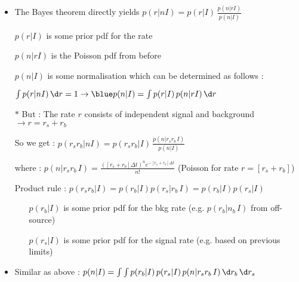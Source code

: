 \Tr
\begin{itemize}
\item The Bayes theorem directly yields {\blue $\displaystyle p(r|nI)=p(r|I)\,\frac{p(n|rI)}{p(n|I)}$}
\item[] $p(r|I)$ is some prior pdf for the rate
\item[] $p(n|rI)$ is the Poisson pdf from before
\item[] $p(n|I)$ is some normalisation which can be determined as follows :
\item[] $\int p(r|nI)\,\d r = 1 \rightarrow {\blue p(n|I)=\int p(r|I)\,p(n|rI)\,\d r}$
\item[$\ast$] But : {\red The rate $r$ consists of independent signal and background $\rightarrow r=r_{s}+r_{b}$}
\item[] So we get : {\blue $\displaystyle p(r_{s}r_{b}|nI)=p(r_{s}r_{b}|I)\,\frac{p(n|r_{s}r_{b}\,I)}{p(n|I)}$}
\item[] where : {\blue $\displaystyle p(n|r_{s}r_{b}\,I)=\frac{([r_{s}+r_{b}]\Delta t)^{n} e^{-[r_{s}+r_{b}]\Delta t}}{n!}$}
        (Poisson for rate $r=[r_{s}+r_{b}]$)
\item[] Product rule : $p(r_{s}r_{b}|I)=p(r_{b}|I)p(r_{s}|r_{b}\,I)=p(r_{b}|I)p(r_{s}|I)$
\begin{itemize}
\item[] $p(r_{b}|I)$ is some prior pdf for the bkg rate (e.g. $p(r_{b}|n_{b}\,I)$ from off-source) 
\item[] $p(r_{s}|I)$ is some prior pdf for the signal rate (e.g. based on previous limits) 
\end{itemize}
\item Similar as above : {\blue $p(n|I)=\int \int p(r_{b}|I)\,p(r_{s}|I)\,p(n|r_{s}r_{b}\,I)\,\d r_{b}\,\d r_{s}$}
\end{itemize}

